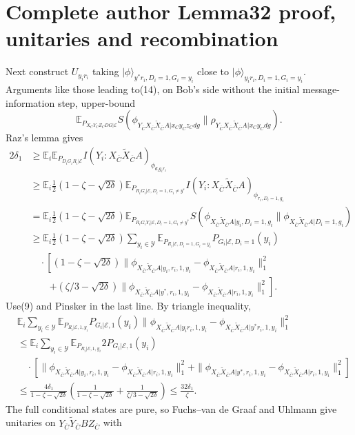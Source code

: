 \documentclass[10pt,a4paper]{article}
\providecommand{\ket}[1]{\lvert#1\rangle}
\providecommand{\QAliceRest}{X_{\overline C}\widetilde X_{\overline C}A}
\providecommand{\QBobRest}{Y_{\overline C}\widetilde Y_{\overline C}BZ_{\overline C}}
\begin{document}
\section*{Complete author Lemma32 proof, unitaries and recombination}
Next construct $U_{y_ir_i}$ taking $\ket\phi_{y^*r_i,D_i=1,G_i=y_i}$ close to $\ket\phi_{y_ir_i,D_i=1,G_i=y_i}$. Arguments like those leading to(14), on Bob's side without the initial message-information step, upper-bound
\[\mathbb E_{P_{X_CY_CZ_CDG|\mathcal E}}S(\phi_{Y_{\overline C}\QAliceRest|x_Cy_Cz_Cdg}\|\rho_{Y_{\overline C}\QAliceRest|x_Cy_Cdg}).\]
Raz's lemma gives
\begin{align*}2\delta_1&\ge\mathbb E_i\mathbb E_{P_{D_iG_iR_i|\mathcal E}}I(Y_i:\QAliceRest)_{\phi_{d_ig_ir_i}}\\&\ge\mathbb E_i\tfrac12(1-\zeta-\sqrt{2\delta})\mathbb E_{P_{R_iG_i|\mathcal E,D_i=1,G_i\ne y^*}}I(Y_i:\QAliceRest)_{\phi_{r_i,D_i=1,g_i}}\\&=\mathbb E_i\tfrac12(1-\zeta-\sqrt{2\delta})\mathbb E_{P_{R_iG_iY_i|\mathcal E,D_i=1,G_i\ne y^*}}S(\phi_{\QAliceRest|y_i,D_i=1,g_i}\|\phi_{\QAliceRest|D_i=1,g_i})\\&\ge\mathbb E_i\tfrac12(1-\zeta-\sqrt{2\delta})\sum_{y_i\in\mathcal Y}\mathbb E_{P_{R_i|\mathcal E,D_i=1,G_i=y_i}}P_{G_i|\mathcal E,D_i=1}(y_i)\\&\quad\cdot\left[(1-\zeta-\sqrt{2\delta})\|\phi_{\QAliceRest|y_i,r_i,1,y_i}-\phi_{\QAliceRest|r_i,1,y_i}\|_1^2\right.\\&\qquad\left.+(\zeta/3-\sqrt{2\delta})\|\phi_{\QAliceRest|y^*,r_i,1,y_i}-\phi_{\QAliceRest|r_i,1,y_i}\|_1^2\right].\end{align*}
Use(9) and Pinsker in the last line. By triangle inequality,
\begin{align*}&\mathbb E_i\sum_{y_i\in\mathcal Y}\mathbb E_{P_{R_i|\mathcal E,1,y_i}}P_{G_i|\mathcal E,1}(y_i)\|\phi_{\QAliceRest|y_ir_i,1,y_i}-\phi_{\QAliceRest|y^*r_i,1,y_i}\|_1^2\\&\le\mathbb E_i\sum_{y_i\in\mathcal Y}\mathbb E_{P_{R_i|\mathcal E,1,y_i}}2P_{G_i|\mathcal E,1}(y_i)\\&\quad\cdot[\|\phi_{\QAliceRest|y_i,r_i,1,y_i}-\phi_{\QAliceRest|r_i,1,y_i}\|_1^2+\|\phi_{\QAliceRest|y^*,r_i,1,y_i}-\phi_{\QAliceRest|r_i,1,y_i}\|_1^2]\\&\le\frac{4\delta_1}{1-\zeta-\sqrt{2\delta}}\left(\frac1{1-\zeta-\sqrt{2\delta}}+\frac1{\zeta/3-\sqrt{2\delta}}\right)\le\frac{32\delta_1}\zeta.
\end{align*}
The full conditional states are pure, so Fuchs--van de Graaf and Uhlmann give unitaries on $\QBobRest$ with
\end{document}

